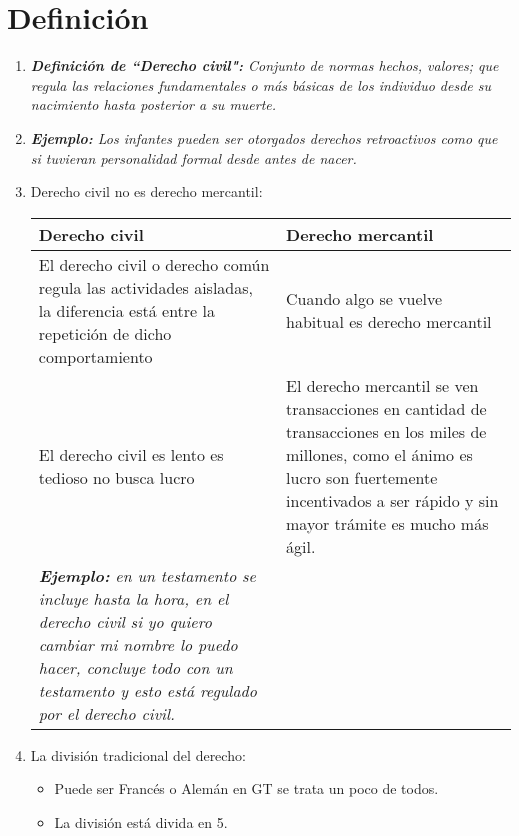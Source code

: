 \section{Definición}
\begin{enumerate}
    \item \emph{\textbf{Definición de ``Derecho civil":} Conjunto de normas hechos, valores; que regula las relaciones fundamentales o más básicas de los individuo desde su nacimiento hasta posterior a su muerte.}
    \item \emph{\textbf{Ejemplo: }Los infantes pueden ser otorgados derechos retroactivos como que si tuvieran personalidad formal desde antes de nacer.}
    \item Derecho civil no es derecho mercantil:
        \begin{center}
           \begin{tabular}{ | p{5cm} | p{5cm} | }
               \hline
               Derecho civil & Derecho mercantil \\ 
               \hline
                    El derecho civil o derecho común regula las actividades aisladas, la diferencia está entre la repetición de dicho comportamiento & Cuando algo se vuelve habitual es derecho mercantil \\
                   El derecho civil es lento es tedioso no busca lucro & El derecho mercantil se ven transacciones en cantidad de transacciones en los miles de millones, como el ánimo es lucro son fuertemente incentivados a ser rápido y sin mayor trámite es mucho más ágil. \\ 
                   \emph{\textbf{Ejemplo: }en un testamento se incluye hasta la hora, en el derecho civil si yo quiero cambiar mi nombre lo puedo hacer, concluye todo con un testamento y esto está regulado por el derecho civil.} & \\ 
               \hline
           \end{tabular}
        \end{center}

        
    \item La división tradicional del derecho:
        \begin{itemize}
            \item Puede ser Francés o Alemán en GT se trata un poco de todos.
            \item La división está divida en 5.
        \end{itemize}
    

\end{enumerate}
